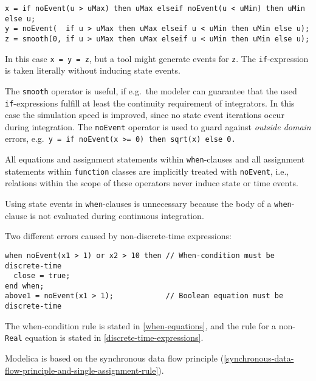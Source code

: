 \begin{example}
\begin{lstlisting}[language=modelica]
x = if noEvent(u > uMax) then uMax elseif noEvent(u < uMin) then uMin else u;
y = noEvent(  if u > uMax then uMax elseif u < uMin then uMin else u);
z = smooth(0, if u > uMax then uMax elseif u < uMin then uMin else u);
\end{lstlisting}

In this case \lstinline!x = y = z!, but a tool might generate events for \lstinline!z!.
The \lstinline!if!-expression is taken literally without inducing state events.

The \lstinline!smooth! operator is useful, if e.g.\ the modeler can guarantee that the used \lstinline!if!-expressions fulfill at least the continuity requirement of integrators.
In this case the simulation speed is improved, since no state event iterations occur during integration.
The \lstinline!noEvent! operator is used to guard against \emph{outside domain} errors, e.g.\ \lstinline!y = if noEvent(x >= 0) then sqrt(x) else 0.!
\end{example}

All equations and assignment statements within \lstinline!when!-clauses and all assignment statements within \lstinline!function! classes are implicitly treated with \lstinline!noEvent!, i.e., relations within the scope of these operators never induce state or time events.

\begin{nonnormative}
Using state events in \lstinline!when!-clauses is unnecessary because the body of a \lstinline!when!-clause is not evaluated during continuous integration.
\end{nonnormative}

\begin{example}
Two different errors caused by non-discrete-time expressions:
\begin{lstlisting}[language=modelica]
when noEvent(x1 > 1) or x2 > 10 then // When-condition must be discrete-time
  close = true;
end when;
above1 = noEvent(x1 > 1);            // Boolean equation must be discrete-time
\end{lstlisting}
The when-condition rule is stated in \cref{when-equations}, and the rule for a non-\lstinline!Real! equation is stated in \cref{discrete-time-expressions}.
\end{example}

Modelica is based on the synchronous data flow principle (\cref{synchronous-data-flow-principle-and-single-assignment-rule}).

